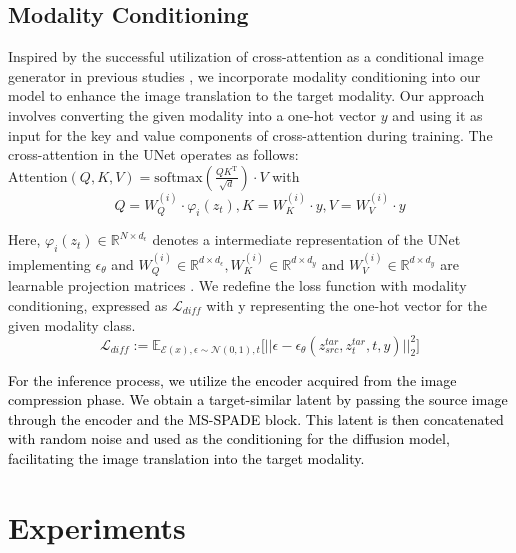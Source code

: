 \documentclass[10pt,twocolumn,letterpaper]{article}
\newcommand{\jhk}[2]{\textcolor{black}{{}#2}}
\begin{document}
\subsection{Modality Conditioning}
Inspired by the successful utilization of cross-attention as a conditional image generator in previous studies \cite{choi2021ilvr, rombach2022high}, we incorporate modality conditioning into our model to enhance the image translation to the target modality. Our approach involves converting the given modality into a one-hot vector $y$ and using it as input for the key and value components of cross-attention during training. The cross-attention in the UNet operates as follows:
$\mathrm{Attention}(Q, K, V) = \mathrm{softmax}(\frac{QK^{\mathrm{T}}}{\sqrt{d}}) \cdot V$
with \begin{equation} 
Q = W_{Q}^{(i)} \cdot \varphi_{i}(z_{t}), K = W_{K}^{(i)} \cdot y, V = W_{V}^{(i)} \cdot y
\end{equation}

\noindent Here, $\varphi_{i}(z_{t}) \in \mathbb{R}^{N\times d_{\epsilon}}$ denotes a intermediate representation of the UNet implementing $\epsilon_{\theta}$ and $W_{Q}^{(i)} \in \mathbb{R}^{d\times d_{\epsilon}}, W_{K}^{(i)} \in \mathbb{R}^{d\times d_{y}}$ and $W_{V}^{(i)} \in \mathbb{R}^{d\times d_{y}}$ are learnable projection matrices \cite{jaegle2021perceiver, rombach2022high, vaswani2017attention}. We redefine the loss function with modality conditioning, expressed as $\mathcal{L}_{diff}$ with y representing the one-hot vector for the given modality class.
\begin{equation}  \label{eq:2}
\mathcal{L}_{diff} := \mathbb{E}_{\mathcal{E}(x), \epsilon \sim \mathcal{N}(0,1), t} \Big[ || \epsilon-\epsilon_\theta(z^{tar}_{src}, z^{tar}_t,t,y)||^2_2 \Big]
\end{equation}

\jhk{}{\noindent For the inference process, we utilize the encoder acquired from the image compression phase. We obtain a target-similar latent by passing the source image through the encoder and the MS-SPADE block. This latent is then concatenated with random noise and used as the conditioning for the diffusion model, facilitating the image translation into the target modality.}



\section{Experiments}
\end{document}
